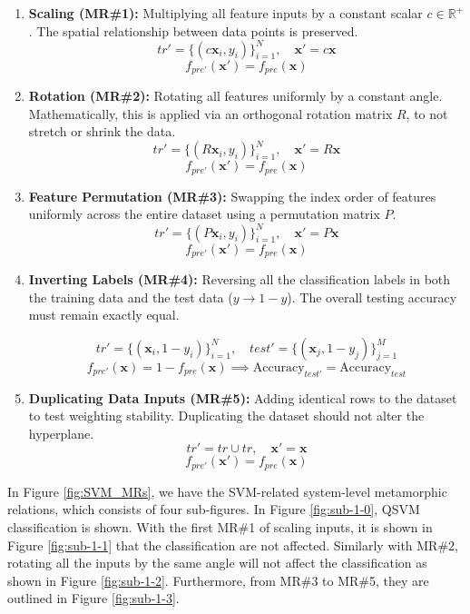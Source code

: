 \documentclass[12pt,a4paper]{article}
\begin{document}
		\begin{enumerate}
			\item \textbf{Scaling (MR\#1):} Multiplying all feature inputs by a constant scalar $c \in \mathbb{R}^+$. The spatial relationship between data points is preserved.
			$$ tr' = \{(c\mathbf{x}_i, y_i)\}_{i=1}^N, \quad \mathbf{x}' = c\mathbf{x} $$
			$$ f_{pre'}(\mathbf{x}') = f_{pre}(\mathbf{x}) $$
			
		\item \textbf{Rotation (MR\#2):} Rotating all features uniformly by a constant angle. Mathematically, this is applied via an orthogonal rotation matrix $R$, to not stretch or shrink the data.
		$$ tr' = \{(R\mathbf{x}_i, y_i)\}_{i=1}^N, \quad \mathbf{x}' = R\mathbf{x} $$
		$$ f_{pre'}(\mathbf{x}') = f_{pre}(\mathbf{x}) $$
			
			\item \textbf{Feature Permutation (MR\#3):} Swapping the index order of features uniformly across the entire dataset using a permutation matrix $P$.
			$$ tr' = \{(P\mathbf{x}_i, y_i)\}_{i=1}^N, \quad \mathbf{x}' = P\mathbf{x} $$
			$$ f_{pre'}(\mathbf{x}') = f_{pre}(\mathbf{x}) $$
			
		\item \textbf{Inverting Labels (MR\#4):} Reversing all the classification labels in both the training data and the test data ($y \to 1 - y$). The overall testing accuracy must remain exactly equal.
		
		$$ tr' = \{(\mathbf{x}_i, 1 - y_i)\}_{i=1}^N, \quad test' = \{(\mathbf{x}_j, 1 - y_j)\}_{j=1}^M $$
		$$ f_{pre'}(\mathbf{x}) = 1 - f_{pre}(\mathbf{x}) \implies \text{Accuracy}_{test'} = \text{Accuracy}_{test} $$
			
			\item \textbf{Duplicating Data Inputs (MR\#5):} Adding identical rows to the dataset to test weighting stability. Duplicating the dataset should not alter the hyperplane.
			$$ tr' = tr \cup tr, \quad \mathbf{x}' = \mathbf{x} $$
			$$ f_{pre'}(\mathbf{x}') = f_{pre}(\mathbf{x}) $$
		\end{enumerate}
		
	In Figure \ref{fig:SVM_MRs}, we have the SVM-related system-level metamorphic relations, which consists of four sub-figures. In Figure \ref{fig:sub-1-0}, QSVM classification is shown. With the first MR\#1 of scaling inputs, it is shown in Figure \ref{fig:sub-1-1} that the classification are not affected. Similarly with MR\#2, rotating all the inputs by the same angle will not affect the classification as shown in Figure \ref{fig:sub-1-2}. Furthermore, from MR\#3 to MR\#5, they are outlined in Figure \ref{fig:sub-1-3}.
	
\end{document}
